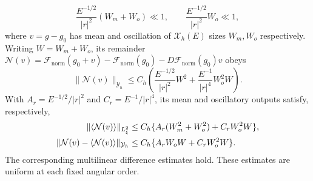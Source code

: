 \begin{lemma}
\begin{equation}
 \frac{E^{-1/2}}{|r|^2}(W_m+W_o)\ll1,
 \qquad
 \frac{E^{-1/2}}{|r|^2}W_o\ll1,
 \label{gauge:height-small}
\end{equation}
where $v=g-g_0$ has mean and oscillation of
$\mathcal X_h(E)$ sizes $W_m,W_o$ respectively.
Writing $W=W_m+W_o$, its remainder
$\mathcal N(v)=\mathcal F_{\mathrm{norm}}(g_0+v)
-\mathcal F_{\mathrm{norm}}(g_0)-D\mathcal F_{\mathrm{norm}}(g_0)v$ obeys
\begin{equation}
 \|\mathcal N(v)\|_{\mathcal Y_h}
 \le C_h\left(\frac{E^{-1/2}}{|r|^2}W^2
              +\frac{E^{-1}}{|r|^4}W_o^2W\right).
 \label{gauge:height-bound}
\end{equation}
With $A_r=E^{-1/2}/|r|^2$ and $C_r=E^{-1}/|r|^4$, its mean and
oscillatory outputs satisfy, respectively,
\begin{align}
 \|\langle\mathcal N(v)\rangle\|_{L^2_\xi}
       &\le C_h\{A_r(W_m^2+W_o^2)+C_rW_o^2W\},\notag\\
 \|\mathcal N(v)-\langle\mathcal N(v)\rangle\|_{\mathcal Y_h}
       &\le C_h\{A_r W_oW+C_rW_o^2W\}.
 \label{gauge:height-projections}
\end{align}
The corresponding multilinear difference estimates hold.  These estimates
are uniform at each fixed angular order.
\end{lemma}
